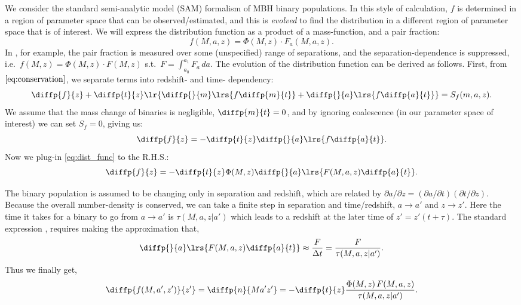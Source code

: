 \documentclass[10pt, oneside, onecolumn]{article}   	%
\begin{document}
        We consider the standard \citep[e.g.~Sesana style; see][]{Chen+2019} semi-analytic model (SAM) formalism of MBH binary populations.  In this style of calculation, $f$ is determined in a region of parameter space that can be observed/estimated, and this is \textit{evolved} to find the distribution in a different region of parameter space that is of interest.  We will express the distribution function as a product of a mass-function, and a pair fraction:
        \begin{equation}
        \label{eq:dist_func}
        f(M,a,z) = \Phi(M, z) \cdot F_a(M, a, z).
        \end{equation}
        In \citet{Chen+2019}, for example, the pair fraction is measured over some (unspecified) range of separations, and the separation-dependence is suppressed, i.e.~$f(M, z) = \Phi(M, z) \cdot F(M, z)$ s.t.~$F = \int_{a_0}^{a_1} F_a \, da$.
        The evolution of the distribution function can be derived as follows.  First, from $\eqref{eq:conservation}$, we separate terms into redshift- and time- dependency:
        \begin{equation}
        \diffp{f}{z} + \diffp{t}{z}\lr{\diffp{}{m} \lrs{f \diffp{m}{t}} + \diffp{}{a} \lrs{f \diffp{a}{t}}} = S_f(m, a, z).
        \end{equation}
        We assume that the mass change of binaries is negligible, $\diffp{m}{t} = 0$, and by ignoring coalescence (in our parameter space of interest) we can set $S_f = 0$, giving us:
        \begin{equation}
        \diffp{f}{z} = - \diffp{t}{z} \diffp{}{a} \lrs{f \diffp{a}{t}}.
        \end{equation}
        Now we plug-in \eqref{eq:dist_func} to the R.H.S.:
        \begin{equation}
        \diffp{f}{z} = - \diffp{t}{z} \Phi(M,z) \diffp{}{a} \lrs{F(M,a,z) \diffp{a}{t}}.
        \end{equation}

        The binary population is assumed to be changing only in separation and redshift, which are related by $\partial a / \partial z = (\partial a / \partial t) (\partial t / \partial z)$.  Because the overall number-density is conserved, we can take a finite step in separation and time/redshift, $a\rightarrow a'$ and $z\rightarrow z'$.  Here the time it takes for a binary to go from $a \rightarrow a'$ is $\tau(M,a,z|a')$ which leads to a redshift at the later time of $z' = z'(t + \tau)$.  The standard expression \citep[e.g.~][~Eq.~5]{Chen+2019}, requires making the approximation that,
        \begin{equation}
        \diffp{}{a} \lrs{F(M,a,z) \diffp{a}{t}} \approx \frac{F}{\Delta t} = \frac{F}{\tau(M,a,z|a')}.
        \end{equation}
        Thus we finally get,
        \begin{equation}
        \diffp{f(M,a',z')}{{z'}} = \diffp{n}{{M}{a'}{z'}} = - \diffp{t}{z} \frac{\Phi(M,z) \, F(M,a,z)}{\tau(M,a,z|a')}.
        \end{equation}
\end{document}
